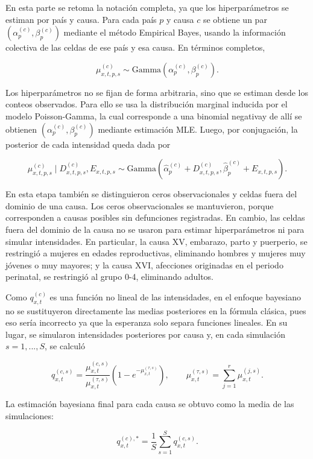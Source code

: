 \documentclass[
  spanish,
  letterpaper,
  DIV=11,
  numbers=noendperiod]{scrartcl}
\begin{document}
En esta parte se retoma la notación completa, ya que los hiperparámetros
se estiman por país y causa. Para cada país \(p\) y causa \(c\) se
obtiene un par \((\alpha_p^{(c)},\beta_p^{(c)})\) mediante el método
Empirical Bayes, usando la información colectiva de las celdas de ese
país y esa causa. En términos completos,

\[\mu_{x,t,p,s}^{(c)}
\sim
\text{Gamma}(\alpha_p^{(c)},\beta_p^{(c)}).\]

Los hiperparámetros no se fijan de forma arbitraria, sino que se estiman
desde los conteos observados. Para ello se usa la distribución marginal
inducida por el modelo Poisson-Gamma, la cual corresponde a una binomial
negativay de allí se obtienen \((\alpha_p^{(c)},\beta_p^{(c)})\)
mediante estimación MLE. Luego, por conjugación, la posterior de cada
intensidad queda dada por

\[\mu_{x,t,p,s}^{(c)}
\mid D_{x,t,p,s}^{(c)},E_{x,t,p,s}
\sim
\text{Gamma}
\left(
\widehat{\alpha}_p^{(c)}+D_{x,t,p,s}^{(c)},
\widehat{\beta}_p^{(c)}+E_{x,t,p,s}
\right).\]

En esta etapa también se distinguieron ceros observacionales y celdas
fuera del dominio de una causa. Los ceros observacionales se
mantuvieron, porque corresponden a causas posibles sin defunciones
registradas. En cambio, las celdas fuera del dominio de la causa no se
usaron para estimar hiperparámetros ni para simular intensidades. En
particular, la causa XV, embarazo, parto y puerperio, se restringió a
mujeres en edades reproductivas, eliminando hombres y mujeres muy
jóvenes o muy mayores; y la causa XVI, afecciones originadas en el
periodo perinatal, se restringió al grupo 0-4, eliminando adultos.

Como \(q_{x,t}^{(c)}\) es una función no lineal de las intensidades, en
el enfoque bayesiano no se sustituyeron directamente las medias
posteriores en la fórmula clásica, pues eso sería incorrecto ya que la
esperanza solo separa funciones lineales. En su lugar, se simularon
intensidades posteriores por causa y, en cada simulación
\(s = 1,...,S\), se calculó

\[q_{x,t}^{(c,s)}
=
\frac{\mu_{x,t}^{(c,s)}}{\mu_{x,t}^{(\tau,s)}}
\left(1-e^{-\mu_{x,t}^{(\tau,s)}}\right),
\qquad
\mu_{x,t}^{(\tau,s)}
=
\sum_{j=1}^{r}\mu_{x,t}^{(j,s)}.\]

La estimación bayesiana final para cada causa se obtuvo como la media de
las simulaciones:

\[q_{x,t}^{(c),*}
=
\frac{1}{S}\sum_{s=1}^{S}q_{x,t}^{(c,s)}.\]
\end{document}
